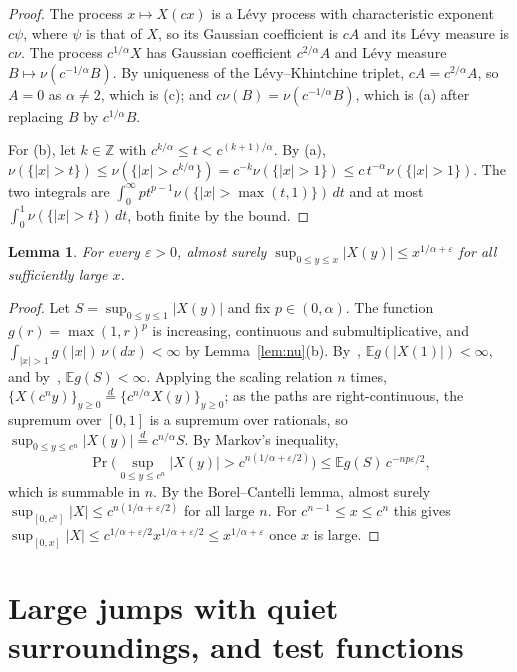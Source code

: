 \documentclass[11pt]{amsart}
\newtheorem{lemma}[theorem]{Lemma}
\theoremstyle{remark}
\newcommand{\E}{\mathbb E}
\begin{document}
\begin{proof}
The process $x\mapsto X(cx)$ is a L\'evy process with characteristic exponent $c\psi$, where $\psi$ is that of $X$, so its Gaussian coefficient is $cA$ and its L\'evy measure is $c\nu$. The process $c^{1/\alpha}X$ has Gaussian coefficient $c^{2/\alpha}A$ and L\'evy measure $B\mapsto\nu(c^{-1/\alpha}B)$. By uniqueness of the L\'evy--Khintchine triplet, $cA=c^{2/\alpha}A$, so $A=0$ as $\alpha\ne2$, which is (c); and $c\nu(B)=\nu(c^{-1/\alpha}B)$, which is (a) after replacing $B$ by $c^{1/\alpha}B$.

For (b), let $k\in\mathbb Z$ with $c^{k/\alpha}\le t<c^{(k+1)/\alpha}$. By (a), $\nu(\{|x|>t\})\le\nu(\{|x|>c^{k/\alpha}\})=c^{-k}\nu(\{|x|>1\})\le c\,t^{-\alpha}\nu(\{|x|>1\})$. The two integrals are $\int_0^\infty pt^{p-1}\nu(\{|x|>\max(t,1)\})\,dt$ and at most $\int_0^1\nu(\{|x|>t\})\,dt$, both finite by the bound.
\end{proof}

\begin{lemma}\label{lem:sup}
For every $\varepsilon>0$, almost surely $\sup_{0\le y\le x}|X(y)|\le x^{1/\alpha+\varepsilon}$ for all sufficiently large $x$.
\end{lemma}

\begin{proof}
Let $S=\sup_{0\le y\le1}|X(y)|$ and fix $p\in(0,\alpha)$. The function $g(r)=\max(1,r)^p$ is increasing, continuous and submultiplicative, and $\int_{|x|>1}g(|x|)\,\nu(dx)<\infty$ by Lemma~\ref{lem:nu}(b). By~\cite[Theorem~25.3]{Sato}, $\E g(|X(1)|)<\infty$, and by~\cite[Theorem~25.18]{Sato}, $\E g(S)<\infty$. Applying the scaling relation $n$ times, $\{X(c^ny)\}_{y\ge0}\overset d=\{c^{n/\alpha}X(y)\}_{y\ge0}$; as the paths are right-continuous, the supremum over $[0,1]$ is a supremum over rationals, so $\sup_{0\le y\le c^n}|X(y)|\overset d=c^{n/\alpha}S$. By Markov's inequality,
\[
\Pr\Big(\sup_{0\le y\le c^n}|X(y)|>c^{n(1/\alpha+\varepsilon/2)}\Big)\le\E g(S)\,c^{-np\varepsilon/2},
\]
which is summable in $n$. By the Borel--Cantelli lemma, almost surely $\sup_{[0,c^n]}|X|\le c^{n(1/\alpha+\varepsilon/2)}$ for all large $n$. For $c^{n-1}\le x\le c^n$ this gives $\sup_{[0,x]}|X|\le c^{1/\alpha+\varepsilon/2}x^{1/\alpha+\varepsilon/2}\le x^{1/\alpha+\varepsilon}$ once $x$ is large.
\end{proof}

\section{Large jumps with quiet surroundings, and test functions}
\end{document}
